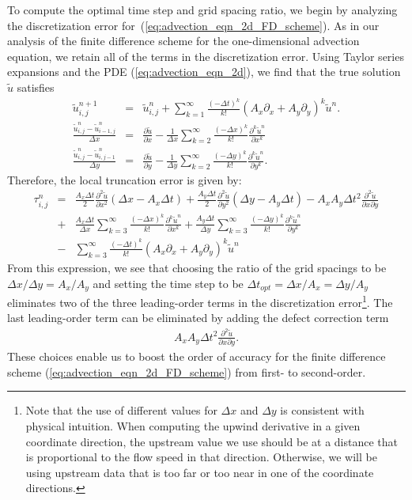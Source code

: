 \documentclass[fleqn,12pt,twoside]{article}
\newcommand{\bea}{\begin{eqnarray}}
\newcommand{\eea}{\end{eqnarray}}
\def\px{\partial x}
\def\py{\partial y}
\def\tu{\tilde{u}}
\def\dt{\Delta t}
\def\dx{\Delta x}
\def\dy{\Delta y}
\begin{document}
To compute the optimal time step and grid spacing ratio, we begin by analyzing 
the discretization error 
for~(\ref{eq:advection_eqn_2d_FD_scheme}).  As in our analysis of the finite
difference scheme for the one-dimensional advection equation, we retain all of 
the terms in the discretization error.  Using Taylor series expansions and
the PDE (\ref{eq:advection_eqn_2d}), we find that the true solution $\tu$ 
satisfies
\bea
  \tu^{n+1}_{i,j} &=& \tu^{n}_{i,j }
    + \sum_{k=1}^\infty \frac{\left( -\dt \right)^k}{k!} 
         \left( A_x \partial_x
              + A_y \partial_y \right)^k \tu^{n}.
  \label{eq:advection_eqn_2d_time_err}
  \\
  \frac{\tu^{n}_{i,j} - \tu^{n}_{i-1,j}}{\dx} &=& 
  \frac{\partial \tu}{\px} 
  - \frac{1}{\dx} \sum_{k=2}^\infty \frac{\left( -\dx \right)^k}{k!} 
       \frac{\partial^k \tu^n}{\px^k} 
  \label{eq:advection_eqn_2d_space_err_x}
  \\
  \frac{\tu^{n}_{i,j} - \tu^{n}_{i,j-1}}{\dy} &=&
  \frac{\partial \tu}{\py} 
  - \frac{1}{\dy} \sum_{k=2}^\infty \frac{\left( -\dy \right)^k}{k!} 
       \frac{\partial^k \tu^n}{\py^k} 
  \label{eq:advection_eqn_2d_space_err_y}.
\eea
Therefore, the local truncation error is given by:
\bea
  \tau^{n}_{i,j} &=&
      \frac{A_x \dt}{2} \frac{\partial^2 \tu}{\px^2}
      \left( \dx - A_x \dt \right)
    + \frac{A_y \dt}{2} \frac{\partial^2 \tu}{\py^2}
      \left( \dy - A_y \dt \right)
    - A_x A_y \dt^2 \frac{\partial^2 \tu}{\px \py}
   \nonumber \\
   &+& \frac{A_x\dt}{\dx} \sum_{k=3}^\infty \frac{\left( -\dx \right)^k}{k!} 
       \frac{\partial^k \tu^n}{\px^k} 
   + \frac{A_y\dt}{\dy} \sum_{k=3}^\infty \frac{\left( -\dy \right)^k}{k!} 
       \frac{\partial^k \tu^n}{\py^k} 
   \nonumber \\
   &-& \sum_{k=3}^\infty \frac{\left( -\dt \right)^k}{k!} 
       \left( A_x \partial_x + A_y \partial_y
              \right)^k \tu^{n} 
  \label{eq:advection_eqn_2d_trunc_err}
\eea
From this expression, we see that choosing the ratio of the grid spacings to
be $\dx/\dy = A_x/A_y$ and setting the time step to be 
$\dt_{opt} = \dx/A_x = \dy/A_y$ eliminates two of the three leading-order 
terms in the discretization error\footnote{Note that the use of different 
values for $\dx$ and $\dy$ is consistent with physical intuition.  When 
computing the upwind derivative in a given coordinate direction, the upstream 
value we use should be at a distance that is proportional to the flow speed in 
that direction.  Otherwise, we will be using upstream data that is too far or 
too near in one of the coordinate directions.}.
The last leading-order term can be eliminated by adding the defect correction 
term
\bea
   A_x A_y \dt^2 \frac{\partial^2 \tu}{\px \py}.
  \label{eq:advection_eqn_2d_corr_term}
\eea
These choices enable us to boost the order of accuracy for the finite 
difference scheme (\ref{eq:advection_eqn_2d_FD_scheme}) from first- to 
second-order.
\end{document}

